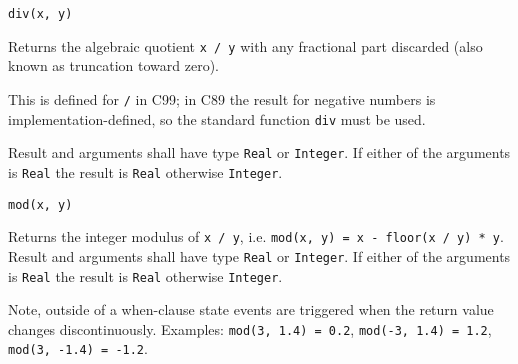\begin{operatordefinition}[div]
\begin{synopsis}\begin{lstlisting}
div(x, y)
\end{lstlisting}\end{synopsis}
\begin{semantics}
Returns the algebraic quotient \lstinline!x / y! with any fractional part discarded (also known as truncation toward zero).
\begin{nonnormative}
This is defined for \lstinline!/! in C99; in C89 the result for negative numbers is implementation-defined, so the standard function \lstinline[language=C]!div! must be used.
\end{nonnormative}
Result and arguments shall have type \lstinline!Real! or \lstinline!Integer!.  If either of the arguments is \lstinline!Real! the result is \lstinline!Real! otherwise \lstinline!Integer!.
\end{semantics}
\end{operatordefinition}

\begin{operatordefinition}[mod]
\begin{synopsis}\begin{lstlisting}
mod(x, y)
\end{lstlisting}\end{synopsis}
\begin{semantics}
Returns the integer modulus of \lstinline!x / y!, i.e. \lstinline!mod(x, y) = x - floor(x / y) * y!.  Result and arguments shall have type \lstinline!Real! or \lstinline!Integer!.  If either of the arguments is \lstinline!Real! the result is \lstinline!Real! otherwise \lstinline!Integer!.
\begin{nonnormative}
Note, outside of a when-clause state events are triggered when the return value changes discontinuously.  Examples: \lstinline!mod(3, 1.4) = 0.2!, \lstinline!mod(-3, 1.4) = 1.2!, \lstinline!mod(3, -1.4) = -1.2!.
\end{nonnormative}
\end{semantics}
\end{operatordefinition}

